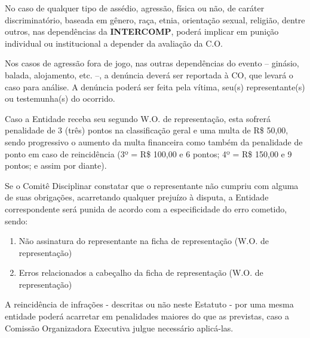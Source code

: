 \begin{article}
	No caso de qualquer tipo de assédio, agressão, física ou não, de caráter discriminatório, baseada em gênero, raça, etnia, orientação sexual, religião, dentre outros, nas dependências da \textbf{INTERCOMP}, poderá implicar em punição individual ou institucional a depender da avaliação da C.O.

	\begin{xparagraph}
		Nos casos de agressão fora de jogo, nas outras dependências do evento -- ginásio, balada, alojamento, etc. --, a denúncia deverá ser reportada à CO, que levará o caso para análise. A denúncia poderá ser feita pela vítima, seu(s) representante(s) ou testemunha(s) do ocorrido.
	\end{xparagraph}
\end{article}

\begin{article}
	Caso a Entidade receba seu segundo W.O. de representação, esta sofrerá penalidade de 3 (três) pontos na classificação geral e uma multa de R\$ 50,00, sendo progressivo o aumento da multa financeira como também da penalidade de ponto em caso de reincidência (3º = R\$ 100,00 e 6 pontos; 4º = R\$ 150,00 e 9 pontos; e assim por diante).

	\begin{xparagraph}
		Se o Comitê Disciplinar constatar que o representante não cumpriu com alguma de suas obrigações, acarretando qualquer prejuízo à disputa, a Entidade correspondente será punida de acordo com a especificidade do erro cometido, sendo:

    	\begin{enumerate}[noitemsep]
    		\item Não assinatura do representante na ficha de representação (W.O. de representação)
    		\item Erros relacionados a cabeçalho da ficha de representação (W.O. de representação)
    	\end{enumerate}
	\end{xparagraph}
\end{article}

\begin{article}
	A reincidência de infrações - descritas ou não neste Estatuto - por uma mesma entidade poderá acarretar em penalidades maiores do que as previstas, caso a Comissão Organizadora Executiva julgue necessário aplicá-las.
\end{article}
